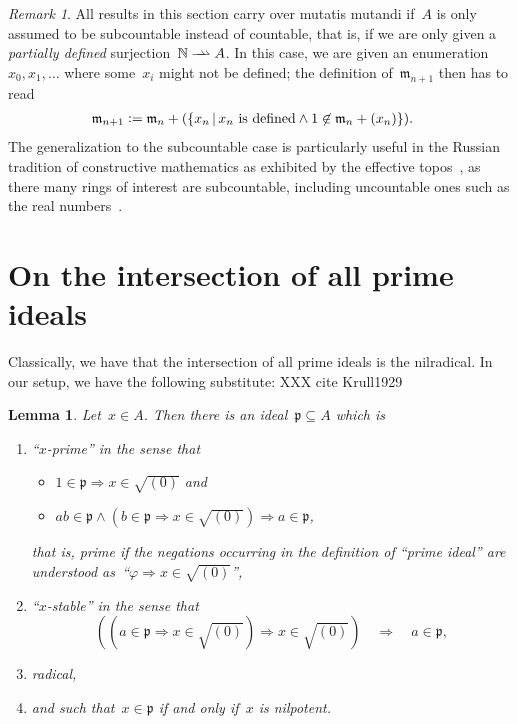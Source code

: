 \documentclass[oneside,reqno]{amsart}
\theoremstyle{definition}
\theoremstyle{plain}
\newtheorem{lemma}[defn]{Lemma}
\theoremstyle{remark}
\newtheorem{rem}[defn]{Remark}
\newcommand{\mmm}{\mathfrak{m}}
\newcommand{\ppp}{\mathfrak{p}}
\newcommand{\NN}{\mathbb{N}}
\newcommand{\defeq}{\vcentcolon=}
\renewcommand{\_}{\mathpunct{.}\,}
\begin{document}
\newcommand{\rightrightharpoonup}{\mathrel{\mathrlap{\rightharpoonup}\mkern1mu\rightharpoonup}}
\begin{rem}All results in this section carry over mutatis mutandi if~$A$ is
only assumed to be subcountable instead of countable, that is, if we are only
given a \emph{partially defined} surjection~$\NN \rightrightharpoonup A$. In
this case, we are given an enumeration~$x_0,x_1,\ldots$ where some~$x_i$
might not be defined; the definition of~$\mmm_{n+1}$ then has to read
\begin{align*}
  \mmm_{n+1} &\defeq \mmm_n + (\{ x_n \,|\, \text{$x_n$ is defined} \wedge 1 \not\in \mmm_n + (x_n) \}).
\end{align*}
The generalization to the subcountable case is particularly useful in the
Russian tradition of constructive mathematics as exhibited by the ef{}fective
topos~\cite{hyland:effective-topos,oosten:realizability,phoa:effective,bauer:c2c},
as there many rings of interest are subcountable, including uncountable ones such as the real
numbers~\cite[Prop.~7.2]{hyland:effective-topos}.
\end{rem}


\section{On the intersection of all prime ideals}

Classically, we have that the intersection of all prime ideals is the
nilradical. In our setup, we have the following substitute:
XXX cite Krull1929

\begin{lemma}\label{lemma:x-prime}
Let~$x \in A$. Then there is an ideal~$\ppp \subseteq A$ which is
\begin{enumerate}
\item ``$x$-prime'' in the sense that
\begin{itemize}
\item $1 \in \ppp \Rightarrow x \in \sqrt{(0)}$ and
\item $ab \in \ppp \wedge (b \in \ppp \Rightarrow x \in \sqrt{(0)}) \Longrightarrow
   a \in \ppp$,
\end{itemize}
that is, prime if the negations occurring in the definition of ``prime ideal''
are understood as~``$\varphi \Rightarrow x \in \sqrt{(0)}$'',
\item ``$x$-stable'' in the sense that
\[ ((a \in \ppp \Rightarrow x \in \sqrt{(0)}) \Rightarrow x \in \sqrt{(0)})
  \quad\Longrightarrow\quad a \in \ppp, \]
\item radical,
\item and such that~$x \in \ppp$ if and only if~$x$ is nilpotent.
\end{enumerate}
\end{lemma}
\end{document}
